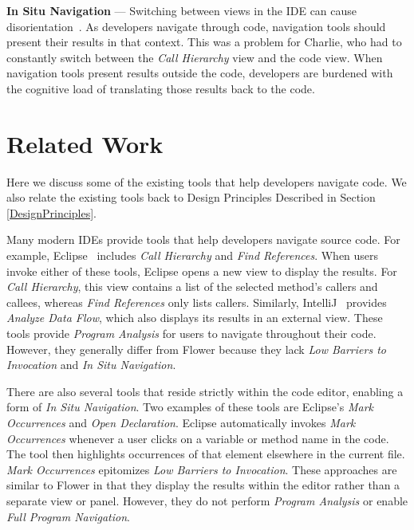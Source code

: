 \documentclass[conference]{IEEEtran}
\begin{document}
\vspace{1em} 
\noindent\textbf{In Situ Navigation}  ---
Switching between views in the IDE can cause disorientation~\cite{deAlwis2006disorient}. 
As developers navigate through code, navigation tools should present their results in that context. 
This was a problem for Charlie, who had to constantly switch between the \emph{Call Hierarchy} view and the code view.
When navigation tools present results outside the code, developers are burdened with the cognitive load of translating those results back to the code.

\section{Related Work}
Here we discuss some of the existing tools that help developers navigate code. We also relate the existing tools back to Design Principles Described in Section \ref{DesignPrinciples}.

Many modern IDEs provide tools that help developers navigate source code. 
For example, Eclipse~\cite{Eclipse} includes \emph{Call Hierarchy} and \emph{Find References}. 
When users invoke either of these tools, Eclipse opens a new view to display the results.
For \emph{Call Hierarchy}, this view contains a list of the selected method's callers and callees, whereas \emph{Find References} only lists callers.
Similarly, IntelliJ~\cite{IntelliJ} provides \emph{Analyze Data Flow}, which also displays its results in an external view.
These tools provide \textit{Program Analysis} for users to navigate throughout their code. 
However, they generally differ from Flower because they lack \textit{Low Barriers to Invocation} and \textit{In Situ Navigation}.

There are also several tools that reside strictly within the code editor, enabling a form of \textit{In Situ Navigation}.
Two examples of these tools are Eclipse's \emph{Mark Occurrences} and \emph{Open Declaration}. 
Eclipse automatically invokes \emph{Mark Occurrences} whenever a user clicks on a variable or method name in the code.
The tool then highlights occurrences of that element elsewhere in the current file.
\emph{Mark Occurrences} epitomizes \textit{Low Barriers to Invocation}.
These approaches are similar to Flower in that they display the results within the editor rather than a separate view or panel.
However, they do not perform \textit{Program Analysis} or enable \textit{Full Program Navigation}.
\end{document}
